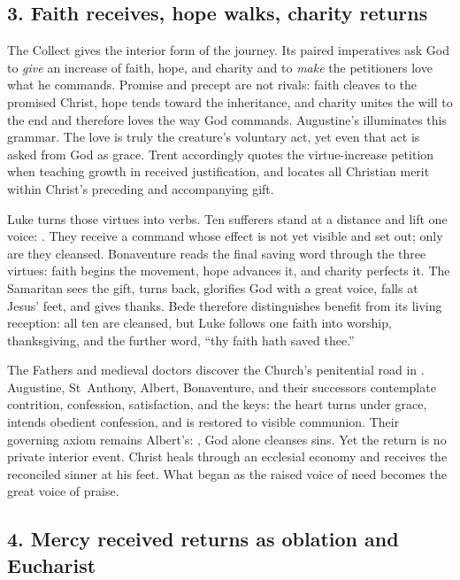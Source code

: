 \clearpage

\subsection*{3. Faith receives, hope walks, charity returns\enspace{}}

The Collect gives the interior form of the journey. Its paired imperatives
ask God to \emph{give} an increase of faith, hope, and charity and to
\emph{make} the petitioners love what he commands. Promise and precept are not
rivals: faith cleaves to the promised Christ, hope tends toward the inheritance,
and charity unites the will to the end and therefore loves the way God commands.
Augustine's  illuminates this grammar.
The love is truly the creature's voluntary act, yet even that act is asked from
God as grace. Trent accordingly quotes the virtue-increase petition when
teaching growth in received justification, and locates all Christian merit
within Christ's preceding and accompanying gift.

Luke turns those virtues into verbs. Ten sufferers stand at a distance and
lift one voice: . They receive a command
whose effect is not yet visible and set out; only  are they
cleansed. Bonaventure reads the final saving word through the three virtues:
faith begins the movement, hope advances it, and charity perfects it. The
Samaritan sees the gift, turns back, glorifies God with a great voice, falls at
Jesus' feet, and gives thanks. Bede therefore distinguishes benefit from its
living reception: all ten are cleansed, but Luke follows one faith into worship,
thanksgiving, and the further word, ``thy faith hath saved thee.''

The Fathers and medieval doctors discover the Church's penitential road in
. Augustine, St~Anthony, Albert, Bonaventure,
and their successors contemplate contrition, confession, satisfaction, and
the keys: the heart turns under grace, intends obedient confession, and is
restored to visible communion. Their governing axiom remains Albert's:
, God alone cleanses sins. Yet the return
is no private interior event. Christ heals through an ecclesial economy and
receives the reconciled sinner at his feet. What began as the raised voice of
need becomes the great voice of praise.

\subsection*{4. Mercy received returns as oblation and Eucharist\enspace{}}


